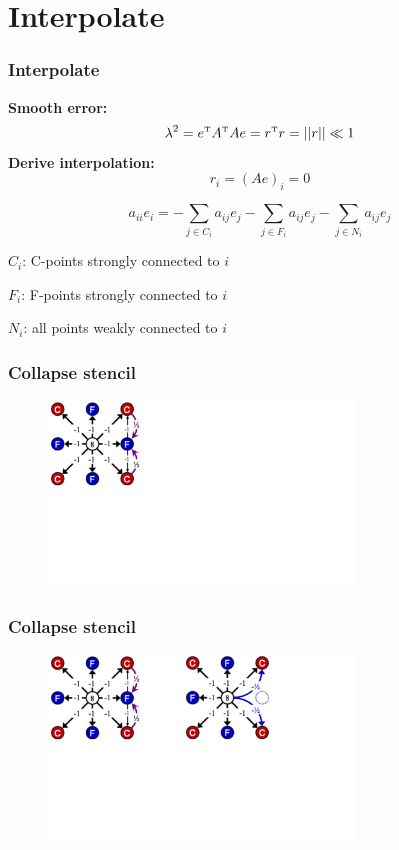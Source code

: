 \documentclass{beamer}
\begin{document}
\section{Interpolate}


\begin{frame}
\frametitle{Interpolate}

\textbf{Smooth error:}
$$\lambda^2 = e^{\mbox{\tiny T}}A^{\mbox{\tiny T}} Ae = r^{\mbox{\tiny T}}r = ||r|| \ll1$$
\textbf{Derive interpolation:}
$$r_i = (Ae)_i = 0$$

    $$a_{ii}e_i = -\sum_{j\in C_i} a_{ij}e_j -\sum_{j\in F_i} a_{ij} e_j -\sum_{j\in N_i} a_{ij}e_j $$

$C_i$: C-points strongly connected to $ i$

$F_i$: F-points strongly connected to $i$

$N_i$: all points weakly connected to $i$

\end{frame}



\begin{frame}
\frametitle{Collapse stencil}

\begin{figure}[h!]
\includegraphics[width=3.2in]{../figures/step1.png}
\end{figure}

\end{frame}


\begin{frame}

\frametitle{Collapse stencil}


\begin{figure}[h!]
\includegraphics[width=3.2in]{../figures/step2.png}
\end{figure}


\end{frame}
\end{document}
